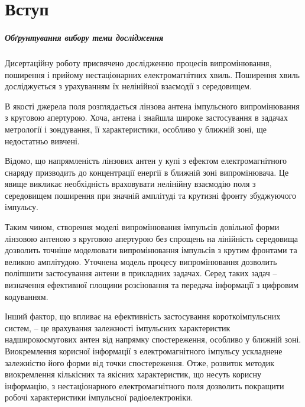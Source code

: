 \chapter*{Вступ}

\paragraph{Обґрунтування вибору теми дослідження}

Дисертаційну роботу присвячено дослідженню процесів випромінювання, поширення 
і прийому нестаціонарних електромагнітних хвиль. Поширення хвиль досліджується 
з урахуванням їх нелінійної взаємодії з середовищем. 

В якості джерела поля розглядається лінзова антена імпульсного випромінювання 
з круговою апертурою. Хоча, антена і знайшла широке застосування в задачах 
метрології і зондування, її характеристики, особливо у ближній зоні, 
ще недостатньо вивчені.

Відомо, що напрямленість лінзових антен у купі з ефектом електромагнітного 
снаряду призводить до концентрації енергії в ближній зоні випромінювача. Це 
явище викликає необхідність враховувати нелінійну взаємодію поля з середовищем 
поширення при значній амплітуді та крутизні фронту збуджуючого імпульсу.

Таким чином, створення моделі випромінювання імпульсів довільної 
форми лінзовою антеною з круговою апертурою без спрощень на лінійність 
середовища дозволить точніше моделювати випромінювання імпульсів з 
крутим фронтами та великою амплітудою. Уточнена модель процесу 
випромінювання дозволить поліпшити застосування антени в прикладних 
задачах. Серед таких задач -- визначення ефективної площини 
розсіювання та передача інформації з цифровим кодуванням.

Інший фактор, що впливає на ефективність застосування короткоімпульсних
систем, -- це врахування залежності імпульсних характеристик 
надширокосмугових антен від напрямку спостереження, особливо у ближній зоні. 
Виокремлення корисної інформації з електромагнітного імпульсу ускладнене 
залежністю його форми від точки спостереження. Отже, 
розвиток методик виокремлення кількісних та якісних характеристик, що несуть 
корисну інформацію, з нестаціонарного електромагнітного поля дозволить 
покращити робочі характеристики імпульсної радіоелектроніки.

